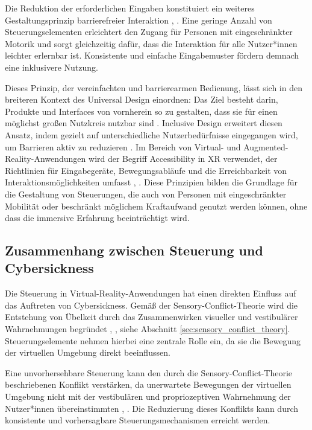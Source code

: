 Die Reduktion der erforderlichen Eingaben konstituiert ein weiteres Gestaltungsprinzip barrierefreier Interaktion \cite{Jason2015}, \cite{Clarkson2003}. Eine geringe Anzahl von Steuerungselementen erleichtert den Zugang für Personen mit eingeschränkter Motorik und sorgt gleichzeitig dafür, dass die Interaktion für alle Nutzer*innen leichter erlernbar ist. Konsistente und einfache Eingabemuster fördern demnach eine inklusivere Nutzung.

Dieses Prinzip, der vereinfachten und barrierearmen Bedienung, lässt sich in den breiteren Kontext des Universal Design einordnen: Das Ziel besteht darin, Produkte und Interfaces von vornherein so zu gestalten, dass sie für einen möglichst großen Nutzkreis nutzbar sind \cite{Molly1998}. Inclusive Design erweitert diesen Ansatz, indem gezielt auf unterschiedliche Nutzerbedürfnisse eingegangen wird, um Barrieren aktiv zu reduzieren \cite{Clarkson2003}.
Im Bereich von Virtual- und Augmented-Reality-Anwendungen wird der Begriff Accessibility in XR verwendet, der Richtlinien für Eingabegeräte, Bewegungsabläufe und die Erreichbarkeit von Interaktionsmöglichkeiten umfasst \cite{Jason2015}, \cite{ISO2025}. Diese Prinzipien bilden die Grundlage für die Gestaltung von Steuerungen, die auch von Personen mit eingeschränkter Mobilität oder beschränkt möglichem Kraftaufwand genutzt werden können, ohne dass die immersive Erfahrung beeinträchtigt wird.

\subsection{Zusammenhang zwischen Steuerung und Cybersickness}
Die Steuerung in Virtual-Reality-Anwendungen hat einen direkten Einfluss auf das Auftreten von Cybersickness. Gemäß der Sensory-Conflict-Theorie wird die Entstehung von Übelkeit durch das Zusammenwirken visueller und vestibulärer Wahrnehmungen begründet \cite{Reason1975}, \cite{LaViola2000}, siehe Abschnitt \ref{sec:sensory_conflict_theory}. Steuerungselemente nehmen hierbei eine zentrale Rolle ein, da sie die Bewegung der virtuellen Umgebung direkt beeinflussen.

Eine unvorhersehbare Steuerung kann den durch die Sensory-Conflict-Theorie beschriebenen Konflikt verstärken, da unerwartete Bewegungen der virtuellen Umgebung nicht mit der vestibulären und propriozeptiven Wahrnehmung der Nutzer*innen übereinstimmten \cite{Reason1975}, \cite{LaViola2000}. Die Reduzierung dieses Konflikts kann durch konsistente und vorhersagbare Steuerungsmechanismen erreicht werden.

